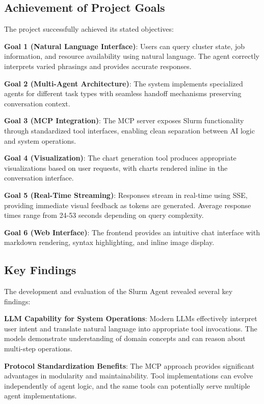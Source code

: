 \subsection{Achievement of Project Goals}

The project successfully achieved its stated objectives:

\textbf{Goal 1 (Natural Language Interface)}: Users can query cluster state, job information, and resource availability using natural language. The agent correctly interprets varied phrasings and provides accurate responses.

\textbf{Goal 2 (Multi-Agent Architecture)}: The system implements specialized agents for different task types with seamless handoff mechanisms preserving conversation context.

\textbf{Goal 3 (MCP Integration)}: The MCP server exposes Slurm functionality through standardized tool interfaces, enabling clean separation between AI logic and system operations.

\textbf{Goal 4 (Visualization)}: The chart generation tool produces appropriate visualizations based on user requests, with charts rendered inline in the conversation interface.

\textbf{Goal 5 (Real-Time Streaming)}: Responses stream in real-time using SSE, providing immediate visual feedback as tokens are generated. Average response times range from 24-53 seconds depending on query complexity.

\textbf{Goal 6 (Web Interface)}: The frontend provides an intuitive chat interface with markdown rendering, syntax highlighting, and inline image display.

\subsection{Key Findings}

The development and evaluation of the Slurm Agent revealed several key findings:

\textbf{LLM Capability for System Operations}: Modern LLMs effectively interpret user intent and translate natural language into appropriate tool invocations. The models demonstrate understanding of domain concepts and can reason about multi-step operations.

\textbf{Protocol Standardization Benefits}: The MCP approach provides significant advantages in modularity and maintainability. Tool implementations can evolve independently of agent logic, and the same tools can potentially serve multiple agent implementations.

